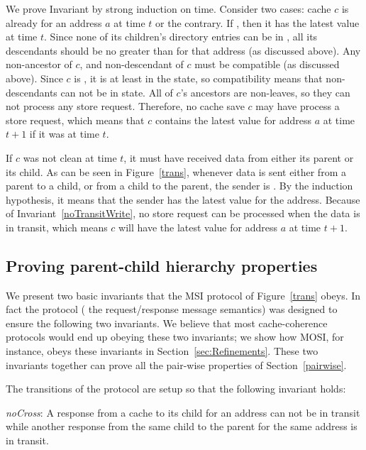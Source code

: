 We prove Invariant  by strong induction on
time. Consider two cases: cache $c$ is already \clean{} for an address
$a$ at time $t$ or the contrary.  If \clean{}, then it has the latest
value at time $t$. Since none of its children's directory entries can
be in \Mo{}, all its descendants should be no greater than \Sh{} for
that address (as discussed above). Any non-ancestor of $c$, and
non-descendant of $c$ must be compatible (as discussed above). Since
$c$ is \clean, it is at least in the \Sh{} state, so compatibility
means that non-descendants can not be in \Mo{} state. All of $c$'s
ancestors are non-leaves, so they can not process any store
request. Therefore, no cache save $c$ may have process a store
request, which means that $c$ contains the latest value for address
$a$ at time $t+1$ if it was \clean{} at time $t$.

If $c$ was not clean at time $t$, it must have received data from
either its parent or its child.  As can be seen in Figure~\ref{trans},
whenever data is sent either from a parent to a child, or from a child
to the parent, the sender is \clean. By the induction hypothesis, it
means that the sender has the latest value for the address. Because of
Invariant~\ref{noTransitWrite}, no store request can be processed when
the data is in transit, which means $c$ will have the latest value for
address $a$ at time $t+1$. 

\subsection{Proving parent-child hierarchy properties}


We present two basic invariants that the MSI protocol of
Figure~\ref{trans} obeys. In fact the protocol (\ie{} the
request/response message semantics) was designed to ensure the
following two invariants. We believe that most cache-coherence
protocols would end up obeying these two invariants; we show how MOSI,
for instance, obeys these invariants in
Section~\ref{sec:Refinements}. These two invariants together can prove
all the pair-wise properties of Section~\ref{pairwise}.

The transitions of the protocol are setup so that the following invariant holds:
\begin{inv}
\textit{noCross}: A response from a cache to its child for an address can not
be in transit while another response from the same child to the parent for the
same address is in transit.
\label{noCross}
\end{inv}

